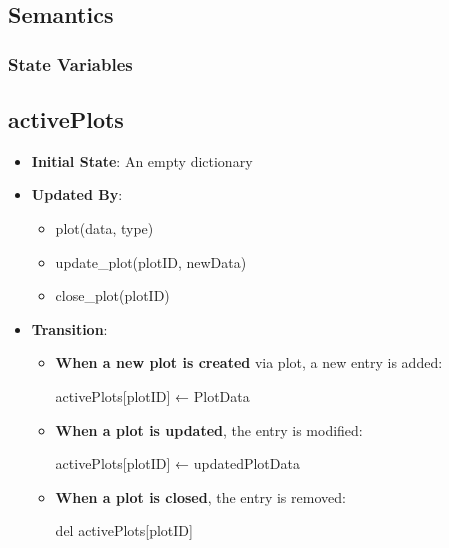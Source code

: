 \documentclass[12pt, titlepage]{article}
\begin{document}
\subsection{Semantics}

\subsubsection{State Variables}




\subsection*{\textbf{activePlots}}





\begin{itemize}
\item
\textbf{Initial State}:
An empty dictionary
\item
\textbf{Updated By}:




\begin{itemize}
\item
plot(data, type)



\item
update\_plot(plotID, newData)



\item
close\_plot(plotID)



\end{itemize}




\item
\textbf{Transition}:




\begin{itemize}
\item
\textbf{When a new plot is created} via plot, a new entry is added:


activePlots[plotID] ← PlotData



\item
\textbf{When a plot is updated}, the entry is modified:


activePlots[plotID] ← updatedPlotData



\item
\textbf{When a plot is closed}, the entry is removed:


del activePlots[plotID]



\end{itemize}




\end{itemize}
\end{document}
